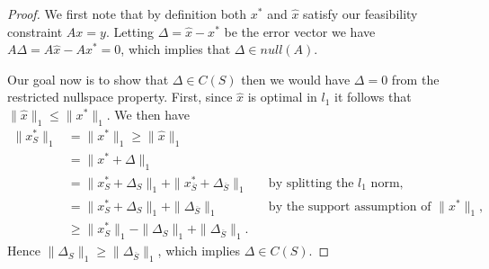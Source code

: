 \begin{proof}
We first note that by definition both $x^*$ and $\hat{x}$ satisfy our feasibility constraint $Ax=y$. Letting $\Delta = \hat{x} - x^*$ be the error vector we have $A\Delta = A\hat{x} - Ax^* = 0$, which implies that $\Delta \in null(A)$.

Our goal now is to show that $\Delta \in C(S)$ then we would have $\Delta = 0$ from the restricted nullspace property. First, since $\hat{x}$ is optimal in $l_1$ it follows that $\|\hat{x}\|_1 \le \|x^*\|_1$. We then have
\begin{align*}
    \|x_S^*\|_1 &= \|x^*\|_1 \ge \|\hat{x}\|_1\\
                &= \|x^* + \Delta\|_1\\
                &= \|x_S^* + \Delta_S\|_1 + \|x_{\overline{S}}^* + \Delta_{\overline{S}}\|_1 &&\text{by splitting the $l_1$ norm,}\\                            
                &= \|x_S^* + \Delta_S\|_1 + \|\Delta_{\overline{S}}\|_1 &&\text{by the support assumption of $\|x^*\|_1$,}\\
                &\ge \|x_S^*\|_1 - \|\Delta_S\|_1 + \|\Delta_{\overline{S}}\|_1.
\end{align*}
Hence $\|\Delta_S\|_1 \ge \|\Delta_{\overline{S}}\|_1$, which implies $\Delta \in C(S)$.
\end{proof}

